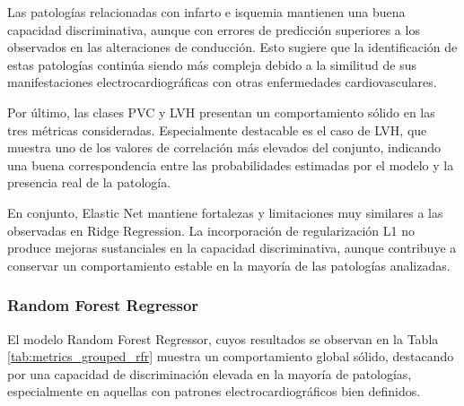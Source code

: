 \documentclass[12pt,a4paper,twoside]{book}
\begin{document}
Las patologías relacionadas con infarto e isquemia mantienen una buena capacidad discriminativa, aunque con errores de predicción superiores a los observados en las alteraciones de conducción. 
Esto sugiere que la identificación de estas patologías continúa siendo más compleja debido a la similitud de sus manifestaciones electrocardiográficas con otras enfermedades cardiovasculares.

Por último, las clases PVC y LVH presentan un comportamiento sólido en las tres métricas consideradas. 
Especialmente destacable es el caso de LVH, que muestra uno de los valores de correlación más elevados del conjunto, indicando una buena correspondencia entre las probabilidades estimadas por el modelo y la presencia real de la patología.

En conjunto, Elastic Net mantiene fortalezas y limitaciones muy similares a las observadas en Ridge Regression. 
La incorporación de regularización L1 no produce mejoras sustanciales en la capacidad discriminativa, aunque contribuye a conservar un comportamiento estable en la mayoría de las patologías analizadas.


\subsubsection*{Random Forest Regressor}

El modelo Random Forest Regressor, cuyos resultados se observan en la Tabla \ref{tab:metrics_grouped_rfr} muestra un comportamiento global sólido, destacando por una capacidad de discriminación elevada en la mayoría de patologías, especialmente en aquellas con patrones electrocardiográficos bien definidos.
\end{document}
